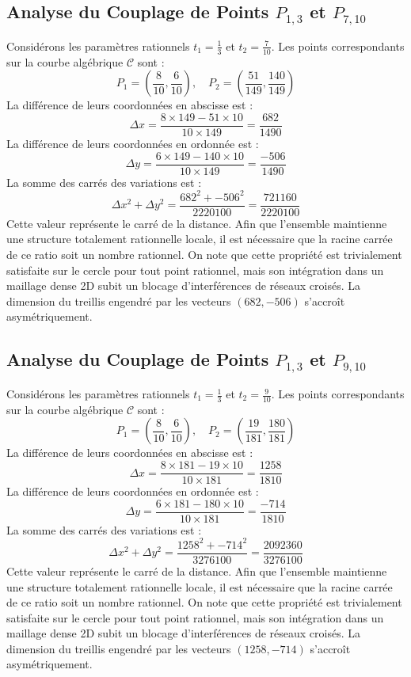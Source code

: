 \documentclass[12pt, a4paper]{article}
\begin{document}
\subsection{Analyse du Couplage de Points $P_{1,3}$ et $P_{7,10}$}
Considérons les paramètres rationnels $t_1 = \frac{1}{3}$ et $t_2 = \frac{7}{10}$.
Les points correspondants sur la courbe algébrique $\mathcal{C}$ sont :
$$ P_1 = \left( \frac{8}{10}, \frac{6}{10} \right), \quad P_2 = \left( \frac{51}{149}, \frac{140}{149} \right) $$
La différence de leurs coordonnées en abscisse est :
$$ \Delta x = \frac{8 \times 149 - 51 \times 10}{10 \times 149} = \frac{682}{1490} $$
La différence de leurs coordonnées en ordonnée est :
$$ \Delta y = \frac{6 \times 149 - 140 \times 10}{10 \times 149} = \frac{-506}{1490} $$
La somme des carrés des variations est :
$$ \Delta x^2 + \Delta y^2 = \frac{ 682^2 + -506^2 }{ 2220100 } = \frac{ 721160 }{ 2220100 } $$
Cette valeur représente le carré de la distance. Afin que l'ensemble maintienne une structure totalement rationnelle locale, il est nécessaire que la racine carrée de ce ratio soit un nombre rationnel. On note que cette propriété est trivialement satisfaite sur le cercle pour tout point rationnel, mais son intégration dans un maillage dense 2D subit un blocage d'interférences de réseaux croisés. La dimension du treillis engendré par les vecteurs $( 682, -506 )$ s'accroît asymétriquement.


\subsection{Analyse du Couplage de Points $P_{1,3}$ et $P_{9,10}$}
Considérons les paramètres rationnels $t_1 = \frac{1}{3}$ et $t_2 = \frac{9}{10}$.
Les points correspondants sur la courbe algébrique $\mathcal{C}$ sont :
$$ P_1 = \left( \frac{8}{10}, \frac{6}{10} \right), \quad P_2 = \left( \frac{19}{181}, \frac{180}{181} \right) $$
La différence de leurs coordonnées en abscisse est :
$$ \Delta x = \frac{8 \times 181 - 19 \times 10}{10 \times 181} = \frac{1258}{1810} $$
La différence de leurs coordonnées en ordonnée est :
$$ \Delta y = \frac{6 \times 181 - 180 \times 10}{10 \times 181} = \frac{-714}{1810} $$
La somme des carrés des variations est :
$$ \Delta x^2 + \Delta y^2 = \frac{ 1258^2 + -714^2 }{ 3276100 } = \frac{ 2092360 }{ 3276100 } $$
Cette valeur représente le carré de la distance. Afin que l'ensemble maintienne une structure totalement rationnelle locale, il est nécessaire que la racine carrée de ce ratio soit un nombre rationnel. On note que cette propriété est trivialement satisfaite sur le cercle pour tout point rationnel, mais son intégration dans un maillage dense 2D subit un blocage d'interférences de réseaux croisés. La dimension du treillis engendré par les vecteurs $( 1258, -714 )$ s'accroît asymétriquement.
\end{document}
